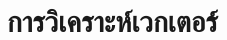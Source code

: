 

\renewcommand{\theequation}{\thechapter.\arabic{equation}}
\baselineskip=8mm
\chapter{การวิเคราะห์เวกเตอร์}

\renewcommand{\thesection}{\thechapter.\arabic{section}}
\renewcommand{\theequation}{\thesection.\arabic{equation}}











